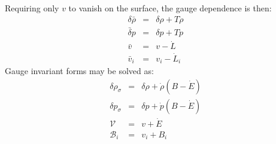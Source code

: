 \documentclass[10pt,letterpaper]{article}
\numberwithin{equation}{section}
\begin{document}
Requiring only $v$ to vanish on the surface, the gauge dependence is then:
\begin{eqnarray}
\delta \bar \rho &=& \delta \rho + T\dot \rho 
\nonumber\\
\bar \delta p &=& \delta p + T\dot p
\nonumber\\
\bar v&=& v-\dot L
\nonumber\\
\bar v_i &=& v_i - \dot L_i
\end{eqnarray}
Gauge invariant forms may be solved as:
\begin{eqnarray}
\delta \rho_\sigma &=& \delta \rho + \dot \rho (B-\dot E)
\nonumber\\
\delta p_\sigma &=& \delta p + \dot p (B-\dot E)
\nonumber\\
\mathcal V &=& v+\dot E
\nonumber\\
\mathcal B_i &=& v_i + B_i
\end{eqnarray}



 
\end{document}
